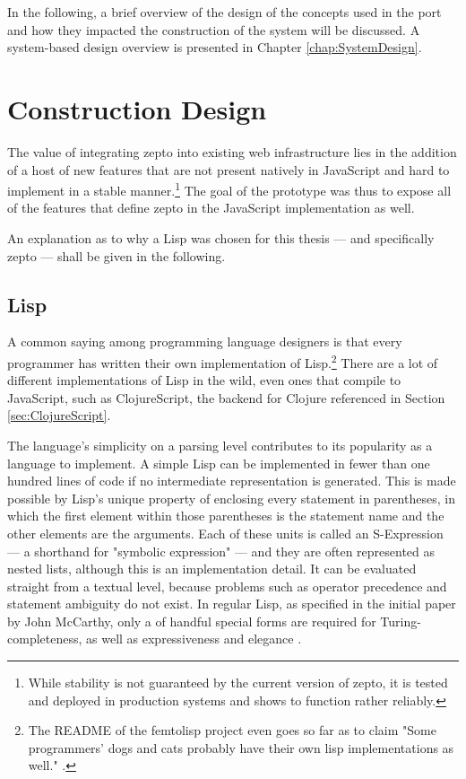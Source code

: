\documentclass[oneside,11pt,xetex]{scrbook}
\begin{document}
In the following, a brief overview of the design of the concepts used
in the port and how they impacted the construction of the system will be
discussed. A system-based design overview is presented in Chapter \ref{chap:SystemDesign}.

\section{Construction Design}
\label{sec:ConstructionDesign}

The value of integrating zepto into existing web infrastructure lies in
the addition of a host of new features that are not present natively in
JavaScript and hard to implement in a stable manner.\footnote{While stability
is not guaranteed by the current version of zepto, it is tested and deployed
in production systems and shows to function rather reliably.}  The goal of
the prototype was thus to expose all of the features that define zepto in
the JavaScript implementation as well.

An explanation as to why a Lisp was chosen for this thesis --- and specifically
zepto --- shall be given in the following.

\subsection{Lisp}

A common saying among programming language designers is that every programmer has written
their own implementation of Lisp.\footnote{The README of the femtolisp project even goes so
far as to claim "Some programmers' dogs and cats probably have their own lisp implementations
as well." \parencite{BEZL}.} There are a lot of different implementations of Lisp
in the wild, even ones that compile to JavaScript, such as ClojureScript, the
backend for Clojure referenced in Section \ref{sec:ClojureScript}.

The language's simplicity on a parsing level contributes to its popularity as
a language to implement.
A simple Lisp can be implemented in fewer than one hundred lines of code if no
intermediate representation is generated. This is made possible by Lisp's unique property
of enclosing every statement in parentheses, in which the first element within
those parentheses is the statement name and the other elements are the arguments.
Each of these units is called an S-Expression --- a shorthand for "symbolic expression" ---
and they are often represented as nested lists, although this is an implementation detail.
It can be evaluated straight from a textual level, because problems such as operator precedence
and statement ambiguity do not exist. In regular Lisp, as specified in the initial paper by
John McCarthy, only a of handful special forms are required for Turing-completeness, as well
as expressiveness and elegance \parencite{JCM}.
\end{document}
